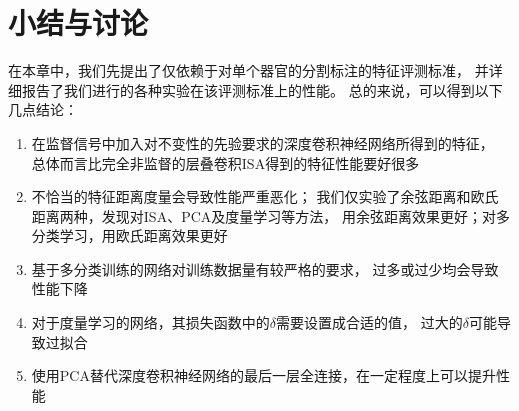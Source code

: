 \section{小结与讨论}
在本章中，我们先提出了仅依赖于对单个器官的分割标注的特征评测标准，
并详细报告了我们进行的各种实验在该评测标准上的性能。
总的来说，可以得到以下几点结论：
\begin{enumerate}
    \item 在监督信号中加入对不变性的先验要求的深度卷积神经网络所得到的特征，
        总体而言比完全非监督的层叠卷积ISA得到的特征性能要好很多
    \item 不恰当的特征距离度量会导致性能严重恶化；
        我们仅实验了余弦距离和欧氏距离两种，发现对ISA、PCA及度量学习等方法，
        用余弦距离效果更好；对多分类学习，用欧氏距离效果更好
    \item 基于多分类训练的网络对训练数据量有较严格的要求，
        过多或过少均会导致性能下降
    \item 对于度量学习的网络，其损失函数中的$\delta$需要设置成合适的值，
        过大的$\delta$可能导致过拟合
    \item 使用PCA替代深度卷积神经网络的最后一层全连接，在一定程度上可以提升性能
\end{enumerate}



